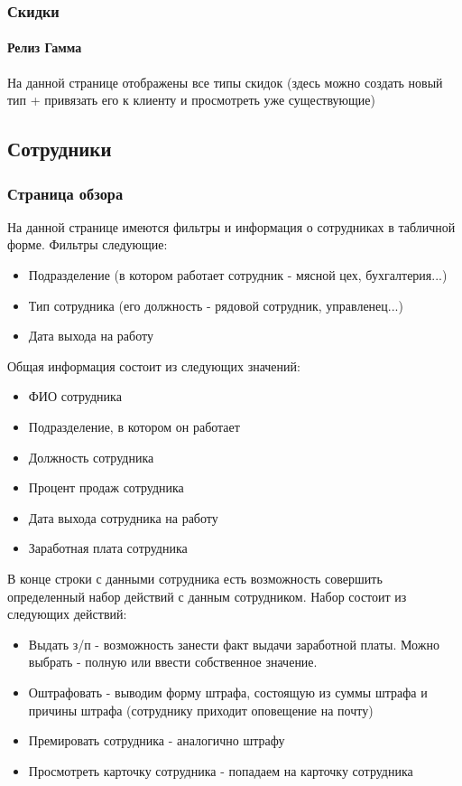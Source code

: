 \documentclass[DIV=calc, paper=a4, fontsize=11pt]{scrartcl} %
\begin{document}
\subsubsection{Скидки}

\paragraph{Релиз Гамма}
На данной странице отображены все типы скидок (здесь можно создать новый тип + привязать его к клиенту и просмотреть уже существующие)



\subsection{Сотрудники}

\subsubsection{Страница обзора}

На данной странице имеются фильтры и информация о сотрудниках в табличной форме. Фильтры следующие:

\begin{itemize}
	\item Подразделение (в котором работает сотрудник - мясной цех, бухгалтерия...)
	\item Тип сотрудника (его должность - рядовой сотрудник, управленец...)
	\item Дата выхода на работу
\end{itemize}

Общая информация состоит из следующих значений:

\begin{itemize}
	\item ФИО сотрудника
	\item Подразделение, в котором он работает 
	\item Должность сотрудника
	\item Процент продаж сотрудника
	\item Дата выхода сотрудника на работу
	\item Заработная плата сотрудника
\end{itemize}

В конце строки с данными сотрудника есть возможность совершить определенный набор действий с данным сотрудником. Набор состоит из следующих действий:
\begin{itemize}
	\item Выдать з/п - возможность занести факт выдачи заработной платы. Можно выбрать - полную или ввести собственное значение.
	\item Оштрафовать - выводим форму штрафа, состоящую из суммы штрафа и причины штрафа (сотруднику приходит оповещение на почту)
	\item Премировать сотрудника - аналогично штрафу
	\item Просмотреть карточку сотрудника - попадаем на карточку сотрудника
\end{itemize}
\end{document}
